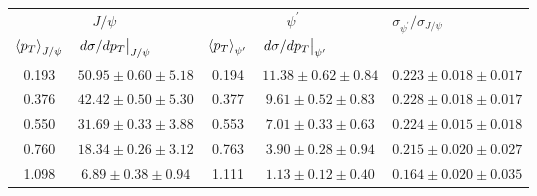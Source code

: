 \begin{tabular}{cc|cc|c}
\hline
\multicolumn{2}{c|}{$J/\psi$} &
  \multicolumn{2}{c|}{$\psi^{\prime}$} &
  \multicolumn{1}{l}{\multirow{2}{*}{$\sigma_{\psi^\prime}/\sigma_{J/\psi}$}} \\ \cline{1-4}
\multicolumn{1}{l}{$\expval{p_T}_{J/\psi}$} &
  \multicolumn{1}{l|}{$\eval{d\sigma/dp_T}_{J/\psi}$} &
  \multicolumn{1}{l}{$\expval{p_T}_{\psi^\prime}$} &
  \multicolumn{1}{l|}{$\eval{d\sigma/dp_T}_{\psi^\prime}$} &
  \multicolumn{1}{l}{} \\ \hline
\multicolumn{1}{c|}{0.193} &
  $50.95\pm0.60\pm5.18$ &
  \multicolumn{1}{c|}{0.194} &
  $11.38\pm0.62\pm0.84$ &
  $0.223\pm0.018\pm0.017$ \\
\multicolumn{1}{c|}{0.376} &
  $42.42\pm0.50\pm5.30$ &
  \multicolumn{1}{c|}{0.377} &
  $9.61\pm0.52\pm0.83$ &
  $0.228\pm0.018\pm0.017$ \\
\multicolumn{1}{c|}{0.550} &
  $31.69\pm0.33\pm3.88$ &
  \multicolumn{1}{c|}{0.553} &
  $7.01\pm0.33\pm0.63$ &
  $0.224\pm0.015\pm0.018$ \\
\multicolumn{1}{c|}{0.760} &
  $18.34\pm0.26\pm3.12$ &
  \multicolumn{1}{c|}{0.763} &
  $3.90\pm0.28\pm0.94$ &
  $0.215\pm0.020\pm0.027$ \\
\multicolumn{1}{c|}{1.098} &
  $6.89\pm0.38\pm0.94$ &
  \multicolumn{1}{c|}{1.111} &
  $1.13\pm0.12\pm0.40$ &
  $0.164\pm0.020\pm0.035$ \\ \hline
\end{tabular}

